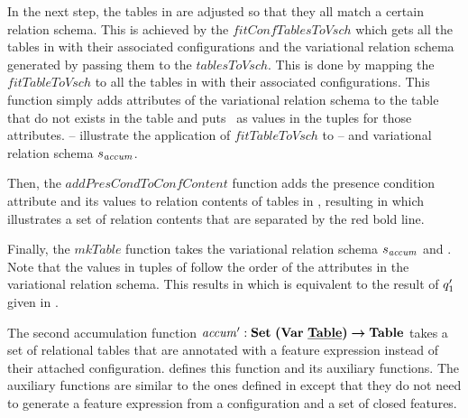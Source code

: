 \begin{example}
%
In the next step, the tables in  are adjusted so that they all match a certain
relation schema. This is achieved by the $\mathit{fitConfTablesToVsch}$ which gets all the 
tables in  with their associated configurations and the variational relation
schema generated by passing them to the $\mathit{tablesToVsch}$. This is done by
mapping the  $\mathit{fitTableToVsch}$ to all the tables in 
 with their associated configurations. This function simply adds
 attributes of the variational relation schema to the table that do not exists in the table 
 and puts \nul\ as values in the tuples for those attributes. 
%
-- illustrate the application of 
$\mathit{fitTableToVsch}$ to -- and variational relation 
schema $\vRelSch_{\mathit{accum}}$.
%

%
Then, the $\mathit{addPresCondToConfContent}$ 
function adds the presence condition attribute and its values 
to relation contents of tables in , resulting in  which illustrates a set of 
relation contents that are separated by the red bold line. 
%

%
Finally, the $\mathit{mkTable}$ function takes the variational relation schema $\vRelSch_{\mathit{accum}}$
and . Note that the values in tuples of  follow the order of the
attributes in the variational relation schema. This results in  which is equivalent to
the result of $\VVal \vQ_1$ given in .

\end{example}

The second accumulation function
 $\VVal {\mathit{accum}} :  \settype {\bm{(}\vartype \pTabSet\bm{)}} \totype \tabletype$ 
 takes a set of relational tables that are annotated with
a feature expression instead of their attached configuration.  defines
this function and its auxiliary functions. The auxiliary functions are similar to the ones
defined in  except that they do not need to generate a feature expression
from a configuration and a set of closed features.
%



